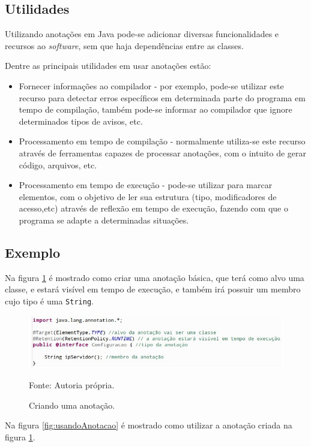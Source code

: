 \documentclass[tc,oneside]{iiufrgs}
\begin{document}
\subsection{Utilidades}

Utilizando anotações em Java pode-se adicionar diversas funcionalidades e recursos ao \textit{software}, sem que haja dependências entre as classes.

 Dentre as principais utilidades em usar anotações estão:

\begin{itemize}
\item Fornecer informações ao compilador - por exemplo, pode-se utilizar este recurso para detectar erros específicos em determinada parte do programa em tempo de compilação, também pode-se informar ao compilador que ignore determinados tipos de avisos, etc.
\item Processamento em tempo de compilação - normalmente utiliza-se este recurso através de ferramentas capazes de processar anotações, com o intuito de gerar código, arquivos, etc. 
\item Processamento em tempo de execução - pode-se utilizar para marcar elementos, com o objetivo de ler sua estrutura (tipo, modificadores de acesso,etc) através de reflexão em tempo de execução, fazendo com que o programa se adapte a determinadas situações.
\end{itemize}
\subsection{Exemplo}

Na figura \ref{fig:criandoAnotacao} é mostrado como criar uma anotação básica, que terá como alvo uma classe, e estará visível em tempo de execução, e também irá possuir um membro cujo tipo é uma \texttt{String}.

\begin{figure}[ht]
	\centering
	\includegraphics[scale=0.6]{figuras/criandoAnnotation.jpg}
	\caption{Criando uma anotação.}
	\small{Fonte: Autoria própria.}
	\label{fig:criandoAnotacao}
\end{figure}

Na figura \ref{fig:usandoAnotacao} é mostrado como utilizar a anotação criada na figura \ref{fig:criandoAnotacao}.
\end{document}
